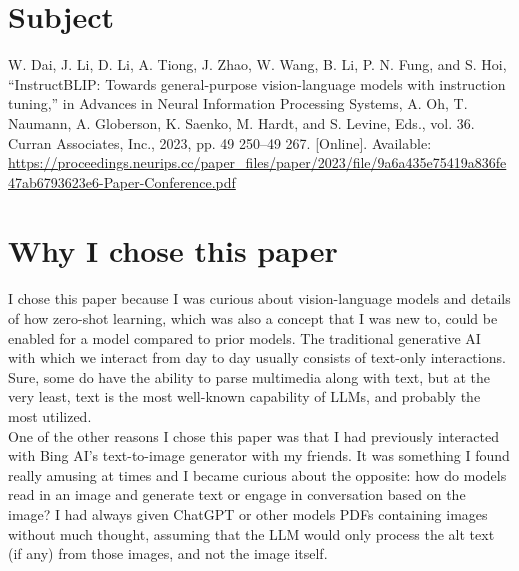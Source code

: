 \documentclass[12pt, letterpaper]{article}
\begin{document}
\pagestyle{empty}
\singlespacing
\vspace{1.0cm}

\begin{spacing}{1.10}

\section{Subject}
\label{sec:subject}
\leavevmode\par\noindent
W. Dai, J. Li, D. Li, A. Tiong, J. Zhao, W. Wang, B. Li, P. N. Fung, and S. Hoi, “InstructBLIP: Towards general-purpose vision-language models with instruction tuning,” in Advances in Neural Information Processing Systems, A. Oh, T. Naumann, A. Globerson, K. Saenko, M. Hardt, and S. Levine, Eds., vol. 36. Curran Associates, Inc., 2023, pp. 49 250–49 267. [Online]. Available: \url{https://proceedings.neurips.cc/paper_files/paper/2023/file/9a6a435e75419a836fe47ab6793623e6-Paper-Conference.pdf}

\section{Why I chose this paper}
\label{sec:why}
\leavevmode\par\noindent
I chose this paper because I was curious about vision-language models and details of how zero-shot learning, which was also a concept that I was new to, could be enabled for a model compared to prior models. The traditional generative AI with which we interact from day to day usually consists of text-only interactions. Sure, some do have the ability to parse multimedia along with text, but at the very least, text is the most well-known capability of LLMs, and probably the most utilized.\\

One of the other reasons I chose this paper was that I had previously interacted with Bing AI's text-to-image generator with my friends. It was something I found really amusing at times and I became curious about the opposite: how do models read in an image and generate text or engage in conversation based on the image? I had always given ChatGPT or other models PDFs containing images without much thought, assuming that the LLM would only process the alt text (if any) from those images, and not the image itself. 


\end{spacing}
\end{document}
